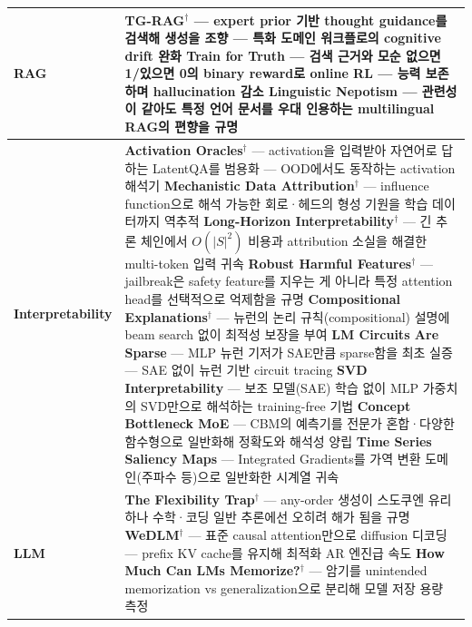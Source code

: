 \documentclass[10pt]{article}
\begin{document}
\begin{minipage}{\linewidth}
{\begin{tabular}{@{}>{\columncolor{labelbg}\bfseries\color{icmlblue!88!black}}p{2.45cm} p{13.15cm}@{}}
\midrule
RAG &
\textbf{TG-RAG}$^\dagger$ — expert prior 기반 thought guidance를 검색해 생성을 조향 — 특화 도메인 워크플로의 cognitive drift 완화 \newline
\textbf{Train for Truth} — 검색 근거와 모순 없으면 1/있으면 0의 binary reward로 online RL — 능력 보존하며 hallucination 감소 \newline
\textbf{Linguistic Nepotism} — 관련성이 같아도 특정 언어 문서를 우대 인용하는 multilingual RAG의 편향을 규명 \\
\midrule
Interpretability &
\textbf{Activation Oracles}$^\dagger$ — activation을 입력받아 자연어로 답하는 LatentQA를 범용화 — OOD에서도 동작하는 activation 해석기 \newline
\textbf{Mechanistic Data Attribution}$^\dagger$ — influence function으로 해석 가능한 회로·헤드의 형성 기원을 학습 데이터까지 역추적 \newline
\textbf{Long-Horizon Interpretability}$^\dagger$ — 긴 추론 체인에서 $O(|S|^2)$ 비용과 attribution 소실을 해결한 multi-token 입력 귀속 \newline
\textbf{Robust Harmful Features}$^\dagger$ — jailbreak은 safety feature를 지우는 게 아니라 특정 attention head를 선택적으로 억제함을 규명 \newline
\textbf{Compositional Explanations}$^\dagger$ — 뉴런의 논리 규칙(compositional) 설명에 beam search 없이 최적성 보장을 부여 \newline
\textbf{LM Circuits Are Sparse} — MLP 뉴런 기저가 SAE만큼 sparse함을 최초 실증 — SAE 없이 뉴런 기반 circuit tracing \newline
\textbf{SVD Interpretability} — 보조 모델(SAE) 학습 없이 MLP 가중치의 SVD만으로 해석하는 training-free 기법 \newline
\textbf{Concept Bottleneck MoE} — CBM의 예측기를 전문가 혼합·다양한 함수형으로 일반화해 정확도와 해석성 양립 \newline
\textbf{Time Series Saliency Maps} — Integrated Gradients를 가역 변환 도메인(주파수 등)으로 일반화한 시계열 귀속 \\
\midrule
LLM &
\textbf{The Flexibility Trap}$^\dagger$ — any-order 생성이 스도쿠엔 유리하나 수학·코딩 일반 추론에선 오히려 해가 됨을 규명 \newline
\textbf{WeDLM}$^\dagger$ — 표준 causal attention만으로 diffusion 디코딩 — prefix KV cache를 유지해 최적화 AR 엔진급 속도 \newline
\textbf{How Much Can LMs Memorize?}$^\dagger$ — 암기를 unintended memorization vs generalization으로 분리해 모델 저장 용량 측정 \newline

\end{tabular}}
\end{minipage}
\end{document}
